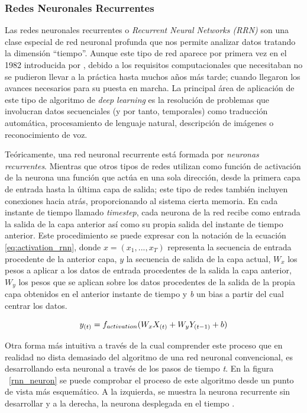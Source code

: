 \subsubsection{Redes Neuronales Recurrentes}
Las redes neuronales recurrentes o \textit{Recurrent Neural Networks (RRN)} son una clase especial de red neuronal profunda que nos permite analizar datos tratando la dimensión ``tiempo''.
Aunque este tipo de red aparece por primera vez en el 1982 introducida por \cite{firstrnn}, debido a los requisitos computacionales que necesitaban no se pudieron llevar a la práctica hasta muchos años más tarde; cuando llegaron los avances necesarios para su puesta en marcha. La principal área de aplicación de este tipo de algoritmo de \textit{deep learning} es la resolución de problemas que involucran datos secuenciales (y por tanto, temporales) como traducción automática, procesamiento de lenguaje natural, descripción de imágenes o reconocimiento de voz. 

Teóricamente, una red neuronal recurrente está formada por \textit{neuronas recurrentes}. Mientras que otros tipos de redes utilizan como función de activación de la neurona una función que actúa en una sola dirección, desde la primera capa de entrada hasta la última capa de salida; este tipo de redes también incluyen conexiones hacia atrás, proporcionando al sistema cierta memoria. En cada instante de tiempo llamado \textit{timestep}, cada neurona de la red recibe como entrada la salida de la capa anterior así como su propia salida del instante de tiempo anterior. Este procedimiento se puede expresar con la notación de la ecuación \ref{eq:activation_rnn}, donde $x = (x_1,...,x_T)$ representa la secuencia de entrada procedente de la anterior capa, $y$ la secuencia de salida de la capa actual, $W_x$ los pesos a aplicar a los datos de entrada procedentes de la salida la capa anterior, $W_y$ los pesos que se aplican sobre los datos procedentes de la salida de la propia capa obtenidos en el anterior instante de tiempo y \textit{b} un bias a partir del cual centrar los datos.

\begin{equation}
	\label{eq:activation_rnn}
	\Large
	y_{(t)} = f_{activation}(W_{x}X_{(t)} + W_{y}Y_{(t-1)}+b)
\end{equation}

Otra forma más intuitiva a través de la cual comprender este proceso que en realidad no dista demasiado del algoritmo de una red neuronal convencional, es desarrollando esta neuronal a través de los pasos de tiempo \textit{t}. En la figura ~\ref{rnn_neuron} se puede comprobar el proceso de este algoritmo desde un punto de vista más esquemático. A la izquierda, se muestra la neurona recurrente sin desarrollar y a la derecha, la neurona desplegada en el tiempo \citep{neuron}.

